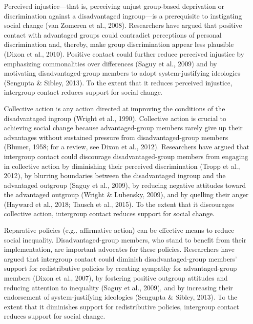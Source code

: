 \documentclass[12pt, letterpaper]{article}
\begin{document}
Perceived injustice---that is, perceiving unjust group-based deprivation
or discrimination against a disadvantaged ingroup---is a prerequisite to
instigating social change (van Zomeren et al., 2008). Researchers have
argued that positive contact with advantaged groups could contradict
perceptions of personal discrimination and, thereby, make group
discrimination appear less plausible (Dixon et al., 2010). Positive
contact could further reduce perceived injustice by emphasizing
commonalities over differences (Saguy et al., 2009) and by motivating
disadvantaged-group members to adopt system-justifying ideologies
(Sengupta \& Sibley, 2013). To the extent that it reduces perceived
injustice, intergroup contact reduces support for social change.

Collective action is any action directed at improving the conditions of
the disadvantaged ingroup (Wright et al., 1990). Collective action is
crucial to achieving social change because advantaged-group members
rarely give up their advantages without sustained pressure from
disadvantaged-group members (Blumer, 1958; for a review, see Dixon et
al., 2012). Researchers have argued that intergroup contact could
discourage disadvantaged-group members from engaging in collective
action by diminishing their perceived discrimination (Tropp et al.,
2012), by blurring boundaries between the disadvantaged ingroup and the
advantaged outgroup (Saguy et al., 2009), by reducing negative attitudes
toward the advantaged outgroup (Wright \& Lubensky, 2009), and by
quelling their anger (Hayward et al., 2018; Tausch et al., 2015). To the
extent that it discourages collective action, intergroup contact reduces
support for social change.

Reparative policies (e.g., affirmative action) can be effective means to
reduce social inequality. Disadvantaged-group members, who stand to
benefit from their implementation, are important advocates for these
policies. Researchers have argued that intergroup contact could diminish
disadvantaged-group members' support for redistributive policies by
creating sympathy for advantaged-group members (Dixon et al., 2007), by
fostering positive outgroup attitudes and reducing attention to
inequality (Saguy et al., 2009), and by increasing their endorsement of
system-justifying ideologies (Sengupta \& Sibley, 2013). To the extent
that it diminishes support for redistributive policies, intergroup
contact reduces support for social change.
\end{document}
